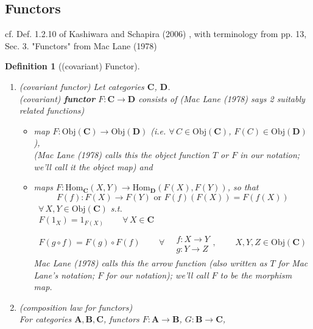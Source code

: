 \documentclass[10pt]{amsart}
\newtheorem{definition}{Definition}
\begin{document}
\begin{multicols*}{2}
\section{Functors}

cf. Def. 1.2.10 of Kashiwara and Schapira (2006) \cite{KaSch2006}, with terminology from pp. 13, Sec. 3. "Functors" from Mac Lane (1978) \cite{MacL1978}

\begin{definition}[(covariant) Functor]\label{Def:Functor}
\begin{enumerate}
	\item (covariant functor) Let categories $\mathbf{C}$, $\mathbf{D}$. \\
(covariant) \textbf{functor} $F: \mathbf{C} \to \mathbf{D}$ consists of (Mac Lane (1978) \cite{MacL1978} says 2 suitably related functions)
\begin{itemize}
	\item map $F: \text{Obj}(\mathbf{C}) \to \text{Obj}(\mathbf{D})$ (i.e. $\forall \, C \in \text{Obj}(\mathbf{C})$, $F(C) \in \text{Obj}(\mathbf{D})$), \\
	(Mac Lane (1978) \cite{MacL1978} calls this the \emph{object function} $T$ or $F$ in our notation; we'll call it the \emph{object map}) and 
	\item maps $F: \text{Hom}_{\mathbf{C}}(X,Y) \to \text{Hom}_{\mathbf{D}}(F(X), F(Y))$, so that 
		\[	
			F(f) : F(X) \to F(Y) \text{ or } F(f)(F(X)) = F(f(X)) 
		\] \, $\forall \, X,Y \in \text{Obj}(\mathbf{C})$ s.t.
	\begin{equation}
	\begin{gathered}
	F(1_X) = 1_{F(X)} \qquad \, \forall \, X \in \mathbf{C} \\
	F(g\circ f) = F(g) \circ F(f) \qquad \, \forall \, \begin{aligned} & \quad \\ 
	& f: X \to Y \\
	& g: Y \to Z \end{aligned}, \qquad \, X,Y,Z \in \text{Obj}(\mathbf{C})
	\end{gathered}
	\end{equation}
	Mac Lane (1978) \cite{MacL1978} calls this the \emph{arrow function} (also written as $T$ for Mac Lane's notation; $F$ for our notation); we'll call $F$ to be the \emph{morphism map}. 
\end{itemize}
\item (composition law for functors) \\
For categories $\mathbf{A} , \mathbf{B}, \mathbf{C}$, functors $F: \mathbf{A} \to \mathbf{B}$, $G: \mathbf{B} \to \mathbf{C}$, \\

\end{enumerate}
\end{definition}
\end{multicols*}
\end{document}
